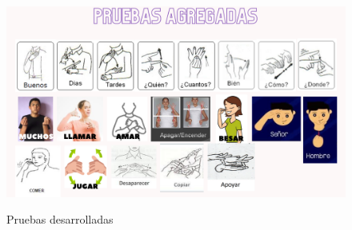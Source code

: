 \documentclass[conference]{IEEEtran}
\begin{document}
\begin{figure}[h]
\centering
{\includegraphics[width=0.95\linewidth]{img/Pruebas agregadas.png}}
    \caption{Pruebas desarrolladas}
\label{fig:pruebas}
\end{figure}
\end{document}
